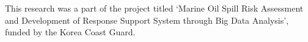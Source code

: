 \documentclass[sigconf]{acmart}
\begin{document}




\maketitle





\begin{acks}
    This research was a part of the project titled `Marine Oil Spill Risk Assessment and Development of Response Support System through Big Data Analysis', funded by the Korea Coast Guard.
\end{acks}



% 

\end{document}
